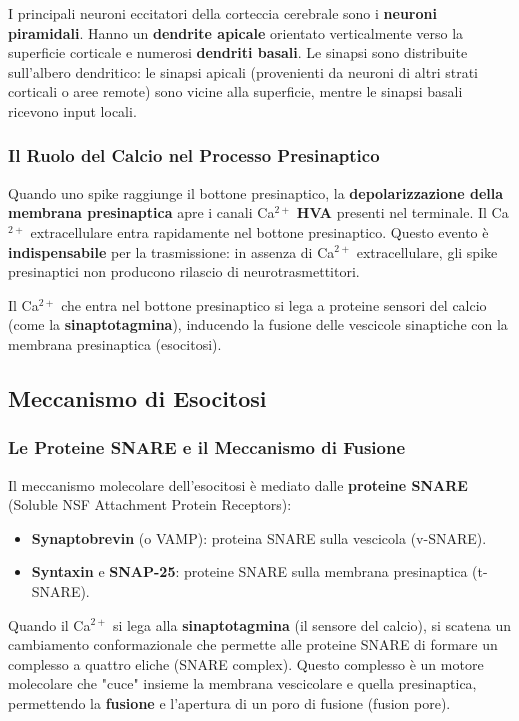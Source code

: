 I principali neuroni eccitatori della corteccia cerebrale sono i \textbf{neuroni piramidali}. Hanno un \textbf{dendrite apicale} orientato verticalmente verso la superficie corticale e numerosi \textbf{dendriti basali}. Le sinapsi sono distribuite sull'albero dendritico: le sinapsi apicali (provenienti da neuroni di altri strati corticali o aree remote) sono vicine alla superficie, mentre le sinapsi basali ricevono input locali.

\subsubsection{Il Ruolo del Calcio nel Processo Presinaptico}

Quando uno spike raggiunge il bottone presinaptico, la \textbf{depolarizzazione della membrana presinaptica} apre i canali Ca$^{2+}$ \textbf{HVA} presenti nel terminale. Il Ca$^{2+}$ extracellulare entra rapidamente nel bottone presinaptico. Questo evento è \textbf{indispensabile} per la trasmissione: in assenza di Ca$^{2+}$ extracellulare, gli spike presinaptici non producono rilascio di neurotrasmettitori.

Il Ca$^{2+}$ che entra nel bottone presinaptico si lega a proteine sensori del calcio (come la \textbf{sinaptotagmina}), inducendo la fusione delle vescicole sinaptiche con la membrana presinaptica (esocitosi).


\subsection{Meccanismo di Esocitosi}

\subsubsection{Le Proteine SNARE e il Meccanismo di Fusione}

Il meccanismo molecolare dell'esocitosi è mediato dalle \textbf{proteine SNARE} (Soluble NSF Attachment Protein Receptors):

\begin{itemize}
    \item \textbf{Synaptobrevin} (o VAMP): proteina SNARE sulla vescicola (v-SNARE).
    \item \textbf{Syntaxin} e \textbf{SNAP-25}: proteine SNARE sulla membrana presinaptica (t-SNARE).
\end{itemize}

Quando il Ca$^{2+}$ si lega alla \textbf{sinaptotagmina} (il sensore del calcio), si scatena un cambiamento conformazionale che permette alle proteine SNARE di formare un complesso a quattro eliche (SNARE complex). Questo complesso è un motore molecolare che "cuce" insieme la membrana vescicolare e quella presinaptica, permettendo la \textbf{fusione} e l'apertura di un poro di fusione (fusion pore).

